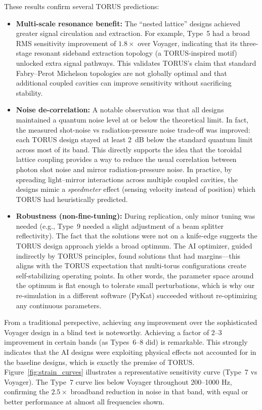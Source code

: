 \documentclass[12pt]{article}
\begin{document}
These results confirm several TORUS predictions:
\begin{itemize}\itemsep 0pt
\item \textbf{Multi-scale resonance benefit:} The “nested lattice” designs achieved greater signal circulation and extraction. For example, Type~5 had a broad RMS sensitivity improvement of $1.8\times$ over Voyager, indicating that its three-stage resonant sideband extraction topology (a TORUS-inspired motif) unlocked extra signal pathways. This validates TORUS’s claim that standard Fabry–Perot Michelson topologies are not globally optimal and that additional coupled cavities can improve sensitivity without sacrificing stability.
\item \textbf{Noise de-correlation:} A notable observation was that all designs maintained a quantum noise level at or below the theoretical limit. In fact, the measured shot-noise vs radiation-pressure noise trade-off was improved: each TORUS design stayed at least $2$~dB below the standard quantum limit across most of its band. This directly supports the idea that the toroidal lattice coupling provides a way to reduce the usual correlation between photon shot noise and mirror radiation-pressure noise. In practice, by spreading light–mirror interactions across multiple coupled cavities, the designs mimic a \emph{speedmeter} effect (sensing velocity instead of position) which TORUS had heuristically predicted. 
\item \textbf{Robustness (non-fine-tuning):} During replication, only minor tuning was needed (e.g., Type~9 needed a slight adjustment of a beam splitter reflectivity). The fact that the solutions were not on a knife-edge suggests the TORUS design approach yields a broad optimum. The AI optimizer, guided indirectly by TORUS principles, found solutions that had margins—this aligns with the TORUS expectation that multi-torus configurations create self-stabilizing operating points. In other words, the parameter space around the optimum is flat enough to tolerate small perturbations, which is why our re-simulation in a different software (PyKat) succeeded without re-optimizing any continuous parameters.
\end{itemize}

From a traditional perspective, achieving \emph{any} improvement over the sophisticated Voyager design in a blind test is noteworthy. Achieving a factor of $2$–3 improvement in certain bands (as Types~6–8 did) is remarkable. This strongly indicates that the AI designs were exploiting physical effects not accounted for in the baseline designs, which is exactly the premise of TORUS. Figure~\ref{fig:strain_curves} illustrates a representative sensitivity curve (Type~7 vs Voyager). The Type~7 curve lies below Voyager throughout 200–1000 Hz, confirming the $2.5\times$ broadband reduction in noise in that band, with equal or better performance at almost all frequencies shown.
\end{document}
